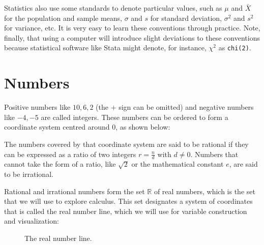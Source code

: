 

Statistics also use some standards to denote particular values, such as $\mu$ and $\bar X$ for the population and sample means, $\sigma$ and $s$ for standard deviation, $\sigma^2$ and $s^2$ for variance, etc. It is very easy to learn these conventions through practice. Note, finally, that using a computer will introduce slight deviations to these conventions because statistical software like Stata might denote, for instance, $\chi^2$ as \texttt{chi(2)}.

\section{Numbers}

Positive numbers like $10, 6, 2$ (the $+$ sign can be omitted) and negative numbers like $-4, -5$ are called integers. These numbers can be ordered to form a coordinate system centred around $0$, as shown below:


The numbers covered by that coordinate system are said to be rational if they can be expressed as a ratio of two integers $r = \frac{n}{d}$ with $d \neq 0$. Numbers that cannot take the form of a ratio, like $\sqrt{2}$ or the mathematical constant $e$, are said to be irrational.

Rational and irrational numbers form the set $\mathbb{R}$ of real numbers, which is the set that we will use to explore calculus. This set designates a system of coordinates that is called the real number line, which we will use for variable construction and visualization:

\begin{figure}[h]
  \caption{The real number line.}
\end{figure}

